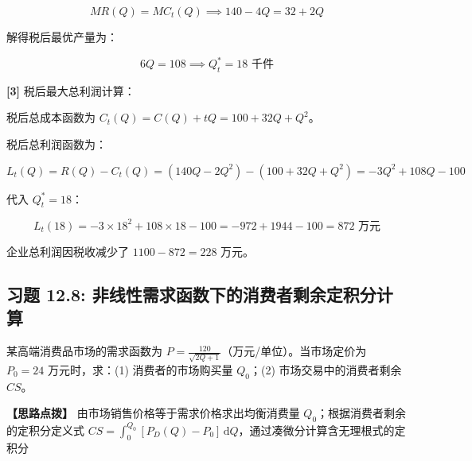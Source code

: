 \documentclass[11pt,a4paper,UTF8]{ctexart}
\begin{document}
\begin{solbox}[分步推导与答题规范]
\begin{equation*}
MR(Q) = MC_t(Q) \implies 140 - 4Q = 32 + 2Q
\end{equation*}


解得税后最优产量为：


\begin{equation*}
6Q = 108 \implies Q_t^* = 18\text{ 千件}
\end{equation*}


\textbf{[3]} 税后最大总利润计算：

税后总成本函数为 $C_t(Q) = C(Q) + tQ = 100 + 32Q + Q^2$。

税后总利润函数为：


\begin{equation*}
L_t(Q) = R(Q) - C_t(Q) = (140Q - 2Q^2) - (100 + 32Q + Q^2) = -3Q^2 + 108Q - 100
\end{equation*}


代入 $Q_t^* = 18$：


\begin{equation*}
L_t(18) = -3 \times 18^2 + 108 \times 18 - 100 = -972 + 1944 - 100 = 872\text{ 万元}
\end{equation*}


企业总利润因税收减少了 $1100 - 872 = 228\text{ 万元}$。
\end{solbox}


\subsection{习题 12.8: 非线性需求函数下的消费者剩余定积分计算}

某高端消费品市场的需求函数为 $P = \frac{120}{\sqrt{2Q+1}}$（万元/单位）。当市场定价为 $P_0 = 24$ 万元时，求：(1) 消费者的市场购买量 $Q_0$；(2) 市场交易中的消费者剩余 $CS$。

\textbf{\color{DeepPurple}【思路点拨】} 由市场销售价格等于需求价格求出均衡消费量 $Q_0$；根据消费者剩余的定积分定义式 $CS = \int_0^{Q_0} [P_D(Q) - P_0]\,\mathrm{d}Q$，通过凑微分计算含无理根式的定积分
\end{document}
